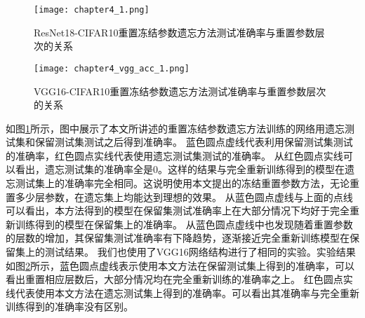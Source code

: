 


\begin{figure}
    \centering
    \texttt{[image: chapter4\_1.png]}
    \caption{ResNet18-CIFAR10重置冻结参数遗忘方法测试准确率与重置参数层次的关系}
    \label{fig:chapter4_1}
\end{figure}

\begin{figure}
    \centering
    \texttt{[image: chapter4\_vgg\_acc\_1.png]}
    \caption{VGG16-CIFAR10重置冻结参数遗忘方法测试准确率与重置参数层次的关系}
    \label{fig:chapter4_vgg_acc_1}
\end{figure}

如图\ref{fig:chapter4_1}所示，图中展示了本文所讲述的重置冻结参数遗忘方法训练的网络用遗忘测试集和保留测试集测试之后得到准确率。
蓝色圆点虚线代表利用保留测试集测试的准确率，红色圆点实线代表使用遗忘测试集测试的准确率。
从红色圆点实线可以看出，遗忘测试集的准确率全是0。这样的结果与完全重新训练得到的模型在遗忘测试集上的准确率完全相同。这说明使用本文提出的冻结重置参数方法，无论重置多少层参数，在遗忘集上均能达到理想的效果。
从蓝色圆点虚线与上面的点线可以看出，本方法得到的模型在保留集测试准确率上在大部分情况下均好于完全重新训练得到的模型在保留集上的准确率。
从蓝色圆点虚线中也发现随着重置参数的层数的增加，其保留集测试准确率有下降趋势，逐渐接近完全重新训练模型在保留集上的测试结果。
我们也使用了VGG16网络结构进行了相同的实验。实验结果如图\ref{fig:chapter4_vgg_acc_1}所示，蓝色圆点虚线表示使用本文方法在保留测试集上得到的准确率，可以看出重置相应层数后，大部分情况均在完全重新训练的准确率之上。
红色圆点实线代表使用本文方法在遗忘测试集上得到的准确率。可以看出其准确率与完全重新训练得到的准确率没有区别。

